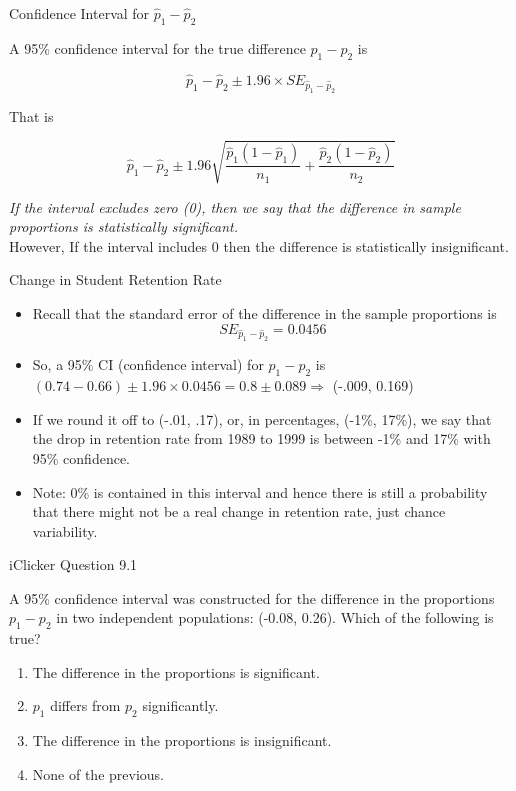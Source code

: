 \documentclass[14pt]{beamer}\usepackage[]{graphicx}\usepackage[]{color}
\begin{document}
\begin{frame}[fragile]{Confidence Interval for $\hat{p}_1 - \hat{p}_2$}

{\small{
A 95\% confidence interval for the true difference $p_1 - p_2$ is

$$\hat{p}_1 - \hat{p}_2 \pm 1.96 \times SE_{ \hat{p}_1 - \hat{p}_2}$$

That is 

$$\hat{p}_1 - \hat{p}_2 \pm 1.96 \sqrt{ \frac{\hat{p}_1 (1-\hat{p}_1)}{n_1} + \frac{\hat{p}_2 (1-\hat{p}_2)}{n_2}}$$

\textit{If the interval excludes zero (0), then we say that the difference in sample proportions is statistically significant.} \\ However, If the interval includes 0 then the difference is statistically insignificant.
}}
\end{frame}

\begin{frame}[fragile]{Change in Student Retention Rate}

{\small{
\begin{itemize}
\item<1-> Recall that the standard error of the difference in the sample  proportions is
$$SE_{\hat{p}_1 - \hat{p}_2} = 0.0456$$
\item<2-> So, a 95\% CI (confidence interval) for $p_1 - p_2$ is
$(0.74 - 0.66) \pm 1.96 \times 0.0456 = 0.8 \pm 0.089 \Rightarrow$ (-.009, 0.169) 
\item<3-> If we round it off to (-.01, .17), or, in percentages, (-1\%, 17\%), we say  that the drop in retention rate from 1989 to 1999 is between -1\% and  17\% with 95\% confidence. 
\item<4-> Note: 0\% is contained in this interval and  hence there is still a probability that there might not be a real change in retention rate, just chance variability.
\end{itemize}
}}
\end{frame}

\begin{frame}[fragile]{iClicker Question 9.1}

A 95\% confidence interval was constructed for the difference in the  proportions $p_1 - p_2$ in two independent populations: (-0.08, 0.26).  Which of the following is true?

\begin{enumerate}
\item The difference in the proportions is significant.
\item $p_1$  differs from $p_2$ significantly.
\item The difference in the proportions is insignificant.
\item None of the previous.
\end{enumerate}

\end{frame}
\end{document}
